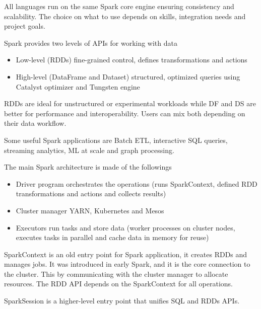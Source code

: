 All languages run on the same Spark core engine ensuring consistency and scalability. The choice on what to use depends on skills, integration needs and project goals. 

\vspace{10pt}

Spark provides two levels of APIs for working with data

\begin{itemize}
    \item Low-level (RDDs) \ra fine-grained control, defines transformations and actions
    \item High-level (DataFrame and Dataset) \ra structured, optimized queries using Catalyst optimizer and Tungsten engine
\end{itemize}

RDDs are ideal for unstructured or experimental workloads while DF and DS are better for performance and interoperability. Users can mix both depending on their data workflow. 

Some useful Spark applications are Batch ETL, interactive SQL queries, streaming analytics, ML at scale and graph processing.

\vspace{10pt}

The main Spark architecture is made of the followings
\begin{itemize}
    \item Driver program \ra orchestrates the operations (runs SparkContext, defined RDD transformations and actions and collects results)
    \item Cluster manager \ra YARN, Kubernetes and Mesos
    \item Executors \ra run tasks and store data (worker processes on cluster nodes, executes tasks in parallel and cache data in memory for reuse)
\end{itemize}

SparkContext is an old entry point for Spark application, it creates RDDs and manages jobs. It was introduced in early Spark, and it is the core connection to the cluster. This by communicating with the cluster manager to allocate resources. The RDD API depends on the SparkContext for all operations.

\vspace{10pt}

SparkSession is a higher-level entry point that unifies SQL and RDDs APIs.

\vspace{10pt}

